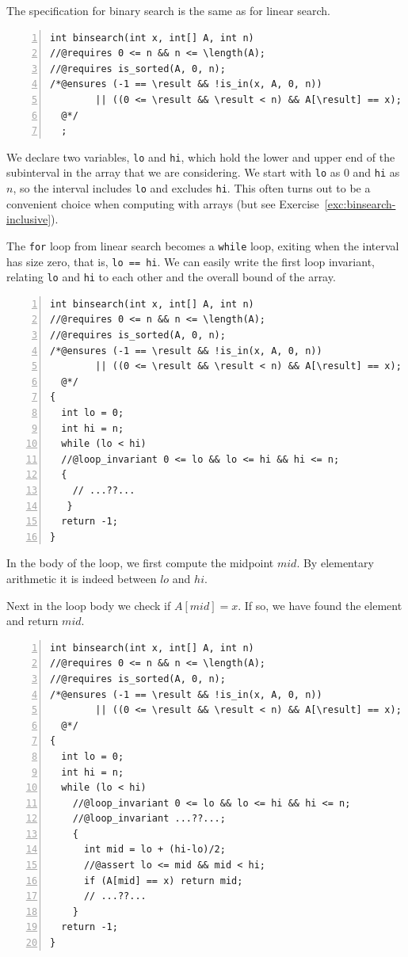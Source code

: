 The specification for binary search is the same as for linear search.
\begin{lstlisting}[language={[C0]C}, numbers=left]
int binsearch(int x, int[] A, int n)
//@requires 0 <= n && n <= \length(A);
//@requires is_sorted(A, 0, n);
/*@ensures (-1 == \result && !is_in(x, A, 0, n))
        || ((0 <= \result && \result < n) && A[\result] == x);
  @*/
  ;
\end{lstlisting}
We declare two variables, \lstinline'lo' and \lstinline'hi', which hold the
lower and upper end of the subinterval in the array that we are
considering.  We start with \lstinline'lo' as $0$ and \lstinline'hi' as
$n$, so the interval includes \lstinline'lo' and excludes \lstinline'hi'.
This often turns out to be a convenient choice when computing with
arrays (but see Exercise~\ref{exc:binsearch-inclusive}).

The \lstinline'for' loop from linear search becomes a \lstinline'while' loop,
exiting when the interval has size zero, that is,
\lstinline'lo == hi'.  We can easily write the first loop invariant,
relating \lstinline'lo' and \lstinline'hi' to each other and the overall
bound of the array.

\begin{lstlisting}[language={[C0]C}, numbers=left]
int binsearch(int x, int[] A, int n)
//@requires 0 <= n && n <= \length(A);
//@requires is_sorted(A, 0, n);
/*@ensures (-1 == \result && !is_in(x, A, 0, n))
        || ((0 <= \result && \result < n) && A[\result] == x);
  @*/
{
  int lo = 0;
  int hi = n;
  while (lo < hi)
  //@loop_invariant 0 <= lo && lo <= hi && hi <= n;
  {
    // ...??...
   }
  return -1;
}
\end{lstlisting}

In the body of the loop, we first compute the midpoint $\mathit{mid}$.  By
elementary arithmetic it is indeed between $\mathit{lo}$ and $\mathit{hi}$.


Next in the loop body we check if $A[\mathit{mid}] = x$.  If so, we
have found the element and return $\mathit{mid}$.
\begin{lstlisting}[language={[C0]C}, numbers=left]
int binsearch(int x, int[] A, int n)
//@requires 0 <= n && n <= \length(A);
//@requires is_sorted(A, 0, n);
/*@ensures (-1 == \result && !is_in(x, A, 0, n))
        || ((0 <= \result && \result < n) && A[\result] == x);
  @*/
{
  int lo = 0;
  int hi = n;
  while (lo < hi)
    //@loop_invariant 0 <= lo && lo <= hi && hi <= n;
    //@loop_invariant ...??...;
    {
      int mid = lo + (hi-lo)/2;
      //@assert lo <= mid && mid < hi;
      if (A[mid] == x) return mid;
      // ...??...
    }
  return -1;
}
\end{lstlisting}

